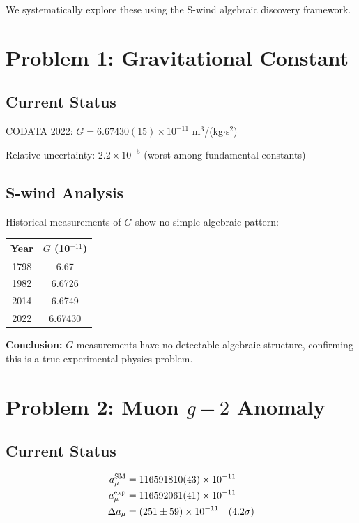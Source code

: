 \documentclass[twocolumn,prl,aps,superscriptaddress]{revtex4-2}
\begin{document}
We systematically explore these using the S-wind algebraic discovery framework.

\section{Problem 1: Gravitational Constant}

\subsection{Current Status}

CODATA 2022: $G = 6.67430(15) \times 10^{-11}$ m$^3$/(kg$\cdot$s$^2$)

Relative uncertainty: $2.2 \times 10^{-5}$ (worst among fundamental constants)

\subsection{S-wind Analysis}

Historical measurements of $G$ show no simple algebraic pattern:
\begin{center}
\begin{tabular}{cc}
Year & $G$ (10$^{-11}$) \\
\hline
1798 & 6.67 \\
1982 & 6.6726 \\
2014 & 6.6749 \\
2022 & 6.67430
\end{tabular}
\end{center}

\textbf{Conclusion:} $G$ measurements have no detectable algebraic structure, 
confirming this is a true experimental physics problem.

\section{Problem 2: Muon $g-2$ Anomaly}

\subsection{Current Status}

\begin{align}
a_\mu^{\rm SM} &= 116591810(43) \times 10^{-11} \\
a_\mu^{\rm exp} &= 116592061(41) \times 10^{-11} \\
\Delta a_\mu &= (251 \pm 59) \times 10^{-11} \quad (4.2\sigma)
\end{align}
\end{document}
